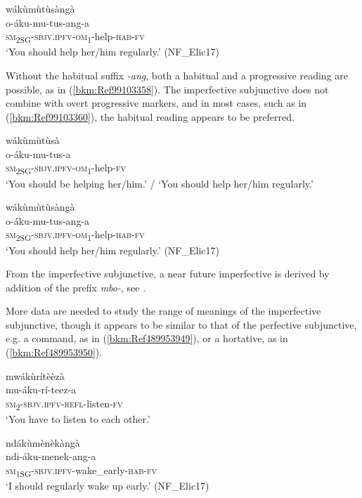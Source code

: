 \ea
\label{bkm:Ref99103335}
\glll wákùmùtùsàngà\\
o-áku-mu-tus-ang-a\\
\textsc{sm}\textsubscript{2SG}-\textsc{sbjv}.\textsc{ipfv}-\textsc{om}\textsubscript{1}-help-\textsc{hab}-\textsc{fv}\\
\glt ‘You should help her/him regularly.’ (NF\_Elic17)
\z

Without the habitual suffix \textit{-ang}, both a habitual and a progressive reading are possible, as in (\ref{bkm:Ref99103358}). The imperfective subjunctive does not combine with overt progressive markers, and in most cases, such as in (\ref{bkm:Ref99103360}), the habitual reading appears to be preferred.

\ea
\label{bkm:Ref99103358}
\glll wákùmùtùsà\\
o-áku-mu-tus-a\\
\textsc{sm}\textsubscript{2SG}-\textsc{sbjv}.\textsc{ipfv}-\textsc{om}\textsubscript{1}-help-\textsc{fv}\\
\glt ‘You should be helping her/him.’ / ‘You should help her/him regularly.’
\z

\ea
\label{bkm:Ref99103360}
\glll wákùmùtùsàngà\\
o-áku-mu-tus-ang-a\\
\textsc{sm}\textsubscript{2SG}-\textsc{sbjv}.\textsc{ipfv}-\textsc{om}\textsubscript{1}-help-\textsc{hab}-\textsc{fv}\\
\glt ‘You should help her/him regularly.’ (NF\_Elic17)
\z

From the imperfective subjunctive, a near future imperfective is derived by addition of the prefix \textit{mbo-}, see .

More data are needed to study the range of meanings of the imperfective subjunctive, though it appears to be similar to that of the perfective subjunctive, e.g. a command, as in (\ref{bkm:Ref489953949}), or a hortative, as in (\ref{bkm:Ref489953950}).

\ea
\label{bkm:Ref489953949}
\glll mwákùrítèèzà\\
mu-áku-rí-teez-a\\
\textsc{sm}\textsubscript{2}-\textsc{sbjv}.\textsc{ipfv}-\textsc{refl}-listen-\textsc{fv}\\
\glt ‘You have to listen to each other.’
\z

\ea
\label{bkm:Ref489953950}
\glll ndákùmènèkàngà\\
ndi-áku-menek-ang-a\\
\textsc{sm}\textsubscript{1SG}-\textsc{sbjv}.\textsc{ipfv}-wake\_early-\textsc{hab}-\textsc{fv}\\
\glt ‘I should regularly wake up early.’ (NF\_Elic17)
\z

